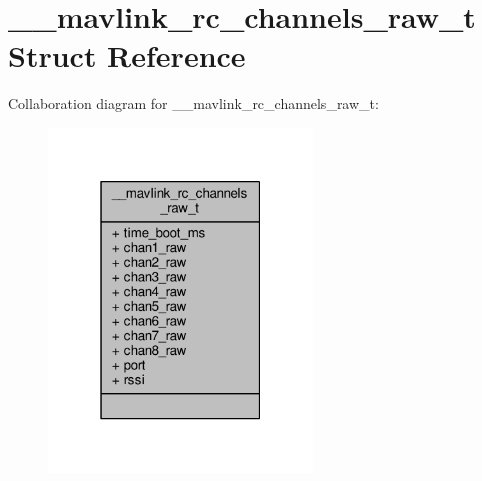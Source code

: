 \hypertarget{struct____mavlink__rc__channels__raw__t}{\section{\+\_\+\+\_\+mavlink\+\_\+rc\+\_\+channels\+\_\+raw\+\_\+t Struct Reference}
\label{struct____mavlink__rc__channels__raw__t}
}


Collaboration diagram for \+\_\+\+\_\+mavlink\+\_\+rc\+\_\+channels\+\_\+raw\+\_\+t\+:
\nopagebreak
\begin{figure}[H]
\begin{center}
\leavevmode
\includegraphics[width=199pt]{struct____mavlink__rc__channels__raw__t__coll__graph}
\end{center}
\end{figure}
